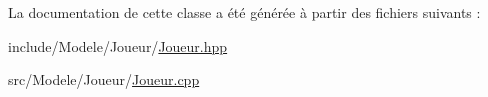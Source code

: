 \-La documentation de cette classe a été générée à partir des fichiers suivants \-:\begin{DoxyCompactItemize}
\item 
include/\-Modele/\-Joueur/\hyperlink{_joueur_8hpp}{\-Joueur.\-hpp}\item 
src/\-Modele/\-Joueur/\hyperlink{_joueur_8cpp}{\-Joueur.\-cpp}\end{DoxyCompactItemize}
